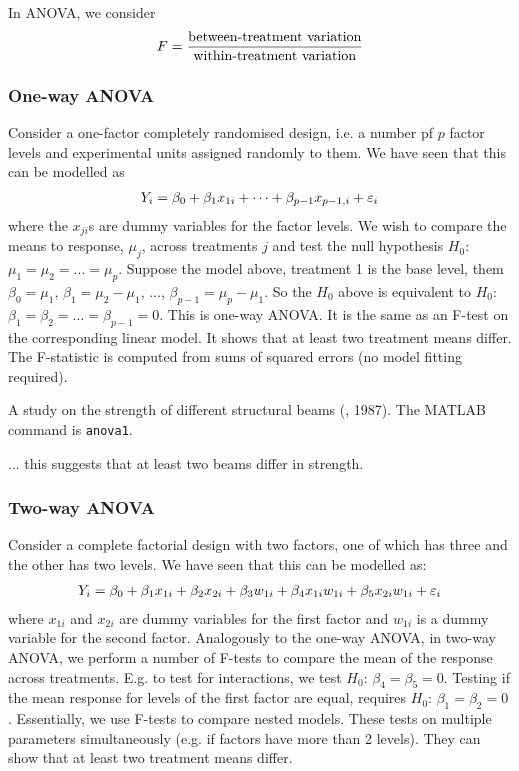 In ANOVA, we consider
\begin{align}
	F = \frac{\text{between-treatment variation}}{\text{within-treatment variation}} \notag
\end{align}

\subsubsection{One-way ANOVA}

Consider a one-factor completely randomised design, i.e. a number pf $p$ factor levels and experimental units assigned randomly to them. We have seen that this can be modelled as
\begin{align}
	Y_i = \beta_0 + \beta_1x_{1i} + \dots + \beta_{p-1}x_{p-1,i} + \epsilon_i \notag
\end{align}
where the $x_{ji}$s are dummy variables for the factor levels. We wish to compare the means to response, $\mu_j$, across treatments $j$ and test the null hypothesis $H_0$: $\mu_1 = \mu_2 = \dots = \mu_p$. Suppose the model above, treatment 1 is the base level, them $\beta_0 = \mu_1$, $\beta_1 = \mu_2 - \mu_1$, ..., $\beta_{p-1} = \mu_p - \mu_1$. So the $H_0$ above is equivalent to $H_0$: $\beta_1 = \beta_2 = \dots = \beta_{p-1} = 0$. This is one-way ANOVA. It is the same as an F-test on the corresponding linear model. It shows that at least two treatment means differ. The F-statistic is computed from sums of squared errors (no model fitting required).

\begin{example}
	A study on the strength of different structural beams (, 1987). The MATLAB command is \texttt{anova1}.
	
	
	... this suggests that at least two beams differ in strength.
\end{example}

\subsubsection{Two-way ANOVA}

Consider a complete factorial design with two factors, one of which has three and the other has two levels. We have seen that this can be modelled as:
\begin{align}
	Y_i = \beta_0 + \beta_1x_{1i} + \beta_2x_{2i} + \beta_3w_{1i} + \beta_4x_{1i}w_{1i} + \beta_5x_{2i}w_{1i} + \epsilon_i \notag
\end{align}
where $x_{1i}$ and $x_{2i}$ are dummy variables for the first factor and $w_{1i}$ is a dummy variable for the second factor. Analogously to the one-way ANOVA, in two-way ANOVA, we perform a number of F-tests to compare the mean of the response across treatments. E.g. to test for interactions, we test $H_0$: $\beta_4 = \beta_5 = 0$. Testing if the mean response for levels of the first factor are equal, requires $H_0$: $\beta_1 = \beta_2 = 0$. Essentially, we use F-tests to compare nested models. These tests on multiple parameters simultaneously (e.g. if factors have more than 2 levels). They can show that at least two treatment means differ.


